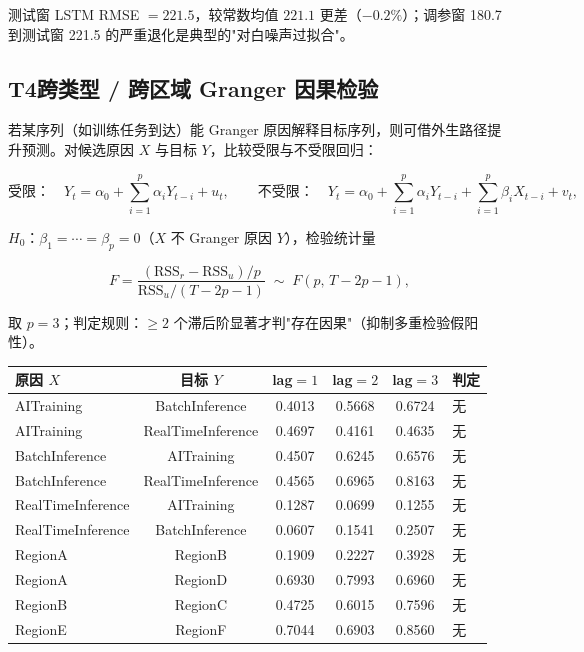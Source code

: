 \documentclass{internal-report}
\begin{document}
测试窗 LSTM RMSE $=221.5$，较常数均值 $221.1$ 更差（$-0.2\%$）；调参窗 180.7 到测试窗 221.5 的严重退化是典型的"对白噪声过拟合"。

\subsection{T4\quad 跨类型 / 跨区域 Granger 因果检验}

若某序列（如训练任务到达）能 Granger 原因解释目标序列，则可借外生路径提升预测。对候选原因 $X$ 与目标 $Y$，比较受限与不受限回归：

\begin{equation}
  \text{受限：}\quad Y_t = \alpha_0 + \sum_{i=1}^{p}\alpha_i Y_{t-i} + u_t,
  \qquad
  \text{不受限：}\quad Y_t = \alpha_0 + \sum_{i=1}^{p}\alpha_i Y_{t-i}
    + \sum_{i=1}^{p}\beta_i X_{t-i} + v_t,
  \label{eq:granger}
\end{equation}

$H_0$：$\beta_1=\cdots=\beta_p=0$（$X$ 不 Granger 原因 $Y$），检验统计量

\begin{equation}
  F = \frac{(\text{RSS}_r - \text{RSS}_u)/p}{\text{RSS}_u/(T-2p-1)}
  \;\sim\; F(p,\, T-2p-1),
  \label{eq:granger_f}
\end{equation}

取 $p=3$；判定规则：$\ge 2$ 个滞后阶显著才判"存在因果"（抑制多重检验假阳性）。

\begin{center}
\footnotesize
\begin{tabular}{lccccl}
\toprule
原因 $X$ & 目标 $Y$ & lag$=1$ & lag$=2$ & lag$=3$ & 判定 \\
\midrule
AITraining & BatchInference & 0.4013 & 0.5668 & 0.6724 & 无 \\
AITraining & RealTimeInference & 0.4697 & 0.4161 & 0.4635 & 无 \\
BatchInference & AITraining & 0.4507 & 0.6245 & 0.6576 & 无 \\
BatchInference & RealTimeInference & 0.4565 & 0.6965 & 0.8163 & 无 \\
RealTimeInference & AITraining & 0.1287 & 0.0699 & 0.1255 & 无 \\
RealTimeInference & BatchInference & 0.0607 & 0.1541 & 0.2507 & 无 \\
\midrule
RegionA & RegionB & 0.1909 & 0.2227 & 0.3928 & 无 \\
RegionA & RegionD & 0.6930 & 0.7993 & 0.6960 & 无 \\
RegionB & RegionC & 0.4725 & 0.6015 & 0.7596 & 无 \\
RegionE & RegionF & 0.7044 & 0.6903 & 0.8560 & 无 \\
\bottomrule
\end{tabular}
\end{center}
\end{document}
